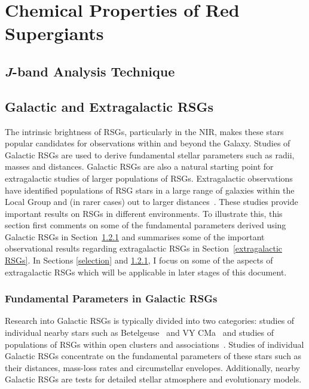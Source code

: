 
\section{Chemical Properties of Red Supergiants} %
\label{sec:chemical_properties_of_red_supergiants}

\subsection{{\it J}-band Analysis Technique} %
\label{sub:subsection_name}

\subsection{Galactic and Extragalactic RSGs} %
\label{sub:galactic_and_extragalactic_rsgs}

The intrinsic brightness of RSGs, particularly in the NIR, makes these stars popular candidates for observations within and beyond the Galaxy.
Studies of Galactic RSGs are used to derive fundamental stellar parameters such as radii, masses and distances.
Galactic RSGs are also a natural starting point for extragalactic studies of larger populations of RSGs.
Extragalactic observations have identified populations of RSG stars in a large range of galaxies within the Local Group and (in rarer cases) out to larger distances~\citep[e.g.][]{Elias85,Humphreys86, Massey06, 2007AJ....134.2474M, Groenewegen09,Massey13}. %
These studies provide important results on RSGs in different environments.
To illustrate this, this section first comments on some of the fundamental parameters derived using Galactic RSGs in Section~\ref{Galactic RSGs} and summarises some of the important observational results regarding extragalactic RSGs in Section~\ref{extragalactic RSGs}.
In Sections
\ref{selection} and
\ref{Galactic RSGs}, I focus on some of the aspects of extragalactic RSGs which will be applicable in later stages of this document.

\subsubsection{Fundamental Parameters in Galactic RSGs}\label{Galactic RSGs}

Research into Galactic RSGs is typically divided into two categories: studies of individual nearby stars such as Betelgeuse~\citep[$197\pm 45$pc;][]{Harper08} and VY CMa~\citep[$1420\pm$ 120pc;][]{Wittowski12} and studies of populations of RSGs within open clusters and associations~\citep[e.g.][]{Levesque05,Negueruela13}.
Studies of individual Galactic RSGs concentrate on the fundamental parameters of these stars such as their distances, mass-loss rates and circumstellar envelopes.
Additionally, nearby Galactic RSGs are tests for detailed stellar atmosphere and evolutionary models.

